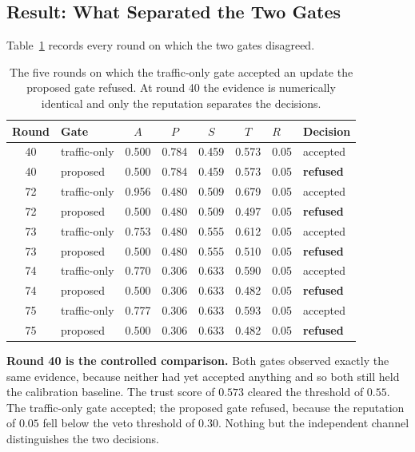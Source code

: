 \documentclass[12pt,a4paper]{report}
\begin{document}
\subsection{Result: What Separated the Two Gates}

Table~\ref{tab:div} records every round on which the two gates disagreed.

\begin{table}[htbp]
\centering
\caption{The five rounds on which the traffic-only gate accepted an update the
proposed gate refused. At round 40 the evidence is numerically identical and only
the reputation separates the decisions.}
\label{tab:div}
\small
\begin{tabular}{@{}clccccll@{}}
\toprule
\textbf{Round} & \textbf{Gate} & $A$ & $P$ & $S$ & $T$ & $R$ &
\textbf{Decision}\\
\midrule
40 & traffic-only & 0.500 & 0.784 & 0.459 & 0.573 & 0.05 & accepted\\
40 & proposed     & 0.500 & 0.784 & 0.459 & 0.573 & 0.05 & \textbf{refused}\\
\midrule
72 & traffic-only & 0.956 & 0.480 & 0.509 & 0.679 & 0.05 & accepted\\
72 & proposed     & 0.500 & 0.480 & 0.509 & 0.497 & 0.05 & \textbf{refused}\\
73 & traffic-only & 0.753 & 0.480 & 0.555 & 0.612 & 0.05 & accepted\\
73 & proposed     & 0.500 & 0.480 & 0.555 & 0.510 & 0.05 & \textbf{refused}\\
74 & traffic-only & 0.770 & 0.306 & 0.633 & 0.590 & 0.05 & accepted\\
74 & proposed     & 0.500 & 0.306 & 0.633 & 0.482 & 0.05 & \textbf{refused}\\
75 & traffic-only & 0.777 & 0.306 & 0.633 & 0.593 & 0.05 & accepted\\
75 & proposed     & 0.500 & 0.306 & 0.633 & 0.482 & 0.05 & \textbf{refused}\\
\bottomrule
\end{tabular}
\end{table}

\textbf{Round 40 is the controlled comparison.} Both gates observed exactly the
same evidence, because neither had yet accepted anything and so both still held
the calibration baseline. The trust score of $0.573$ cleared the threshold of
$0.55$. The traffic-only gate accepted; the proposed gate refused, because the
reputation of $0.05$ fell below the veto threshold of $0.30$. Nothing but the
independent channel distinguishes the two decisions.
\end{document}
